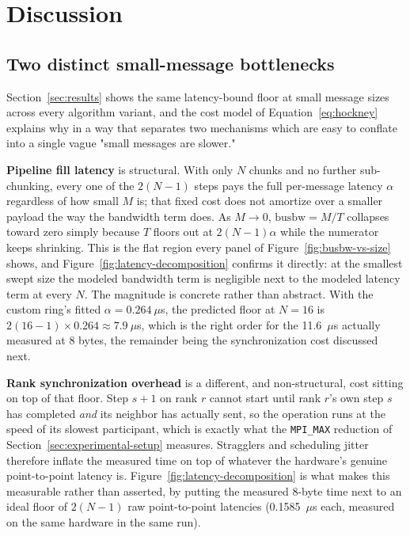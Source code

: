 \section{Discussion}
\label{sec:discussion}

\subsection{Two distinct small-message bottlenecks}

Section~\ref{sec:results} shows the same latency-bound floor at small message sizes across every algorithm variant, and the cost model of Equation~\ref{eq:hockney} explains why in a way that separates two mechanisms which are easy to conflate into a single vague "small messages are slower."

\textbf{Pipeline fill latency} is structural. With only $N$ chunks and no further sub-chunking, every one of the $2(N-1)$ steps pays the full per-message latency $\alpha$ regardless of how small $M$ is; that fixed cost does not amortize over a smaller payload the way the bandwidth term does. As $M \to 0$, $\text{busbw} = M/T$ collapses toward zero simply because $T$ floors out at $2(N-1)\alpha$ while the numerator keeps shrinking. This is the flat region every panel of Figure~\ref{fig:busbw-vs-size} shows, and Figure~\ref{fig:latency-decomposition} confirms it directly: at the smallest swept size the modeled bandwidth term is negligible next to the modeled latency term at every $N$. The magnitude is concrete rather than abstract. With the custom ring's fitted $\alpha = 0.264~\mu$s, the predicted floor at $N=16$ is $2(16-1) \times 0.264 \approx 7.9~\mu$s, which is the right order for the 11.6~$\mu$s actually measured at 8 bytes, the remainder being the synchronization cost discussed next.

\textbf{Rank synchronization overhead} is a different, and non-structural, cost sitting on top of that floor. Step $s+1$ on rank $r$ cannot start until rank $r$'s own step $s$ has completed \emph{and} its neighbor has actually sent, so the operation runs at the speed of its slowest participant, which is exactly what the \texttt{MPI\_MAX} reduction of Section~\ref{sec:experimental-setup} measures. Stragglers and scheduling jitter therefore inflate the measured time on top of whatever the hardware's genuine point-to-point latency is. Figure~\ref{fig:latency-decomposition} is what makes this measurable rather than asserted, by putting the measured 8-byte time next to an ideal floor of $2(N-1)$ raw point-to-point latencies (0.1585~$\mu$s each, measured on the same hardware in the same run).

